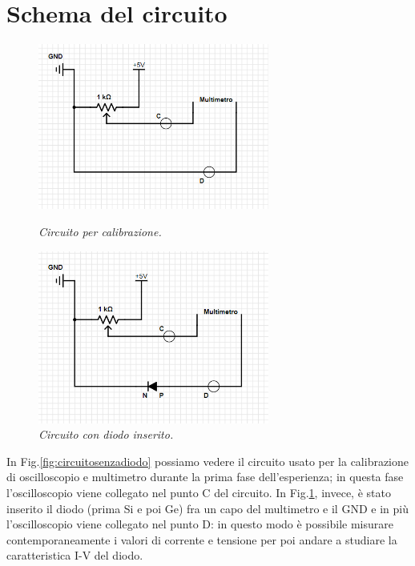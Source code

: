 \documentclass[a4paper, 11pt]{article}
\begin{document}
\section{Schema del circuito}
\begin{figure}[!ht]
  \centering
  \begin{minipage}[b]{0.51\textwidth}
    \includegraphics[width=76mm]{Immagini - Prima prova/Circuito senza diodo.png}
    \caption{\textit{Circuito per calibrazione.}}
    \label{fig:circuitosenzadiodo}
  \end{minipage}
  \hfill
  \begin{minipage}[b]{0.48\textwidth}
    \includegraphics[width=76mm]{Immagini - Prima prova/Circuito con diodo.png}
    \caption{\textit{Circuito con diodo inserito.}}
    \label{fig:circuitocondiodo}
  \end{minipage}
\end{figure}
In Fig.\ref{fig:circuitosenzadiodo} possiamo vedere il circuito usato per la calibrazione di oscilloscopio e multimetro durante la prima fase dell'esperienza; in questa fase l'oscilloscopio viene collegato nel punto C del circuito. In Fig.\ref{fig:circuitocondiodo}, invece, è stato inserito il diodo (prima Si e poi Ge) fra un capo del multimetro e il GND e in più l'oscilloscopio viene collegato nel punto D: in questo modo è possibile misurare contemporaneamente i valori di corrente e tensione per poi andare a studiare la caratteristica I-V del diodo.
\end{document}
